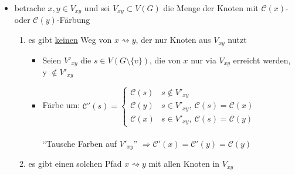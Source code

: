 \begin{description}
\begin{description}
\begin{enumerate}
\begin{itemize}
                            \item betrache $x,y \in V_{xy}$ und sei $V_{xy} \subset V(G)$ die Menge der Knoten mit $\mathcal{C}(x)$- oder $\mathcal{C}(y)$-Färbung
                                \begin{enumerate}
                                    \item es gibt \underline{keinen} Weg von $x \rightsquigarrow y$, der nur Knoten aus $V_{xy}$ nutzt
                                        \begin{itemize}
                                            \item Seien $V'_{xy}$ die $s \in V(G \setminus \{v\})$, die von $x$ nur via $V_{xy}$ erreicht werden, y $\notin V'_{xy}$ 
                                            \item Färbe um:
                                            \begin{math}
                                                \mathcal{C'}(s) =
                                                    \begin{cases}
                                                        \mathcal{C}(s) & s \not \in V'_{xy}\\
                                                        \mathcal{C}(y) & s \in V'_{xy}, ~ \mathcal{C}(s) = \mathcal{C}(x)\\
                                                        \mathcal{C}(x) & s \in V'_{xy}, ~ \mathcal{C}(s) = \mathcal{C}(y)
                                                    \end{cases}
                                            \end{math}\\\\
                                            ``Tausche Farben auf $V'_{xy}$'' $\Rightarrow \mathcal{C'}(x) = \mathcal{C'}(y) = \mathcal{C}(y)$
                                        \end{itemize}
                                    \item es gibt einen solchen Pfad $x \rightsquigarrow y$ mit allen Knoten in $V_{xy}$

\end{enumerate}
\end{itemize}
\end{enumerate}
\end{description}
\end{description}
